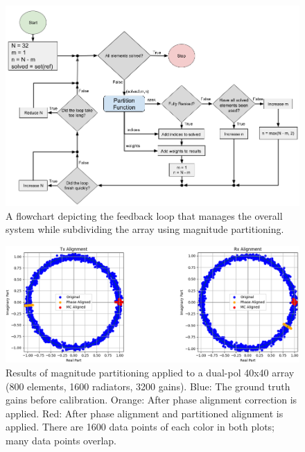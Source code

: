 \documentclass[journal]{IEEEtran}
\begin{document}
\begin{figure}
    \centering
    \includegraphics[width=0.9\linewidth]{Outer Scope Distcal.png}
    \caption{A flowchart depicting the feedback loop that manages the overall system while subdividing the array using magnitude partitioning.}
    \label{fig:outerScope}
\end{figure}


 \begin{figure}[ht]
    \centering
    \includegraphics[width=0.95\linewidth]{agnosticSubResults-fixed.png}
    \caption{Results of magnitude partitioning applied to a dual-pol 40x40 array (800 elements, 1600 radiators, 3200 gains). Blue: The ground truth gains before calibration. Orange: After phase alignment correction is applied. Red: After phase alignment and partitioned alignment is applied. There are 1600 data points of each color in both plots; many data points overlap.}
    \label{fig:agnosticSubResult}
\end{figure}
\end{document}
